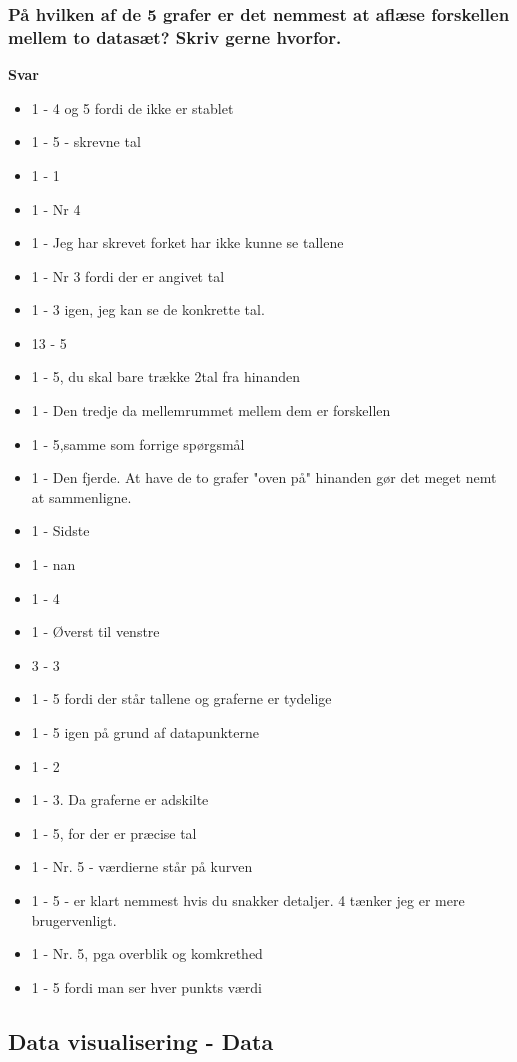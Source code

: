 \subsubsection{På hvilken af de 5 grafer er det nemmest at aflæse forskellen mellem to datasæt? Skriv gerne hvorfor.}
\textbf{Svar}
\begin{itemize}
    \item 1 - 4 og 5 fordi de ikke er stablet
    \item 1 - 5 - skrevne tal
    \item 1 - 1
    \item 1 - Nr 4
    \item 1 - Jeg har skrevet forket har ikke kunne se tallene
    \item 1 - Nr 3 fordi der er angivet tal
    \item 1 - 3 igen, jeg kan se de konkrette tal.
    \item 13 - 5
    \item 1 - 5, du skal bare trække 2tal fra hinanden
    \item 1 - Den tredje da mellemrummet mellem dem er forskellen
    \item 1 - 5,samme som forrige spørgsmål
    \item 1 - Den fjerde. At have de to grafer "oven på" hinanden gør det meget nemt at sammenligne.
    \item 1 - Sidste
    \item 1 - nan
    \item 1 - 4
    \item 1 - Øverst til venstre
    \item 3 - 3
    \item 1 - 5 fordi der står tallene og graferne er tydelige
    \item 1 - 5 igen på grund af datapunkterne
    \item 1 - 2
    \item 1 - 3. Da graferne er adskilte
    \item 1 - 5, for der er præcise tal
    \item 1 - Nr. 5 - værdierne står på kurven
    \item 1 - 5 - er klart nemmest hvis du snakker detaljer. 4 tænker jeg er mere brugervenligt.
    \item 1 - Nr. 5, pga overblik og komkrethed
    \item 1 - 5 fordi man ser hver punkts værdi
\end{itemize}

\subsection{Data visualisering - Data}

